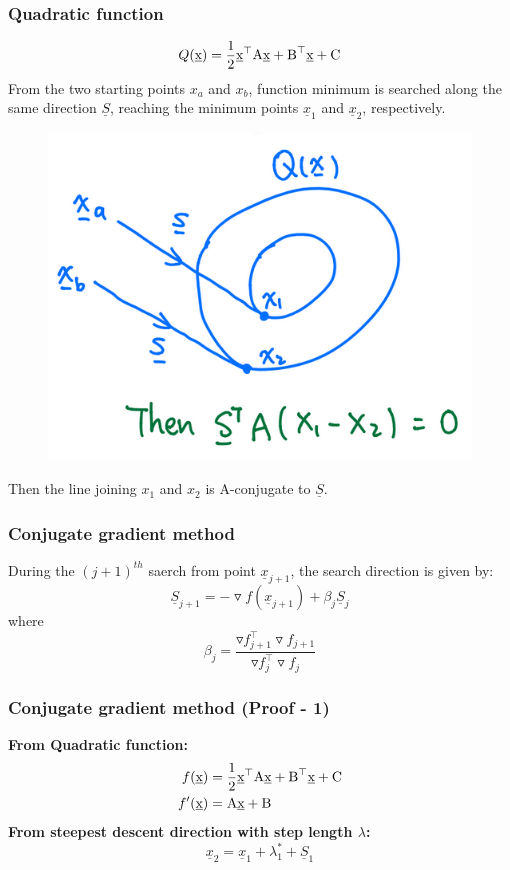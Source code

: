 \documentclass{beamer}
\begin{document}
\begin{frame}
    \frametitle{Quadratic function}
    $$Q(\textrm{\underline{x}})=\frac{1}{2}\textrm{\underline{x}}^\top\textrm{A}\textrm{\underline{x}}+
    \textrm{B}^\top\textrm{\underline{x}}+\textrm{C}
    $$
    From the two starting points $x_a$ and $x_b$, function minimum is searched along the same direction $\underline{S}$,
    reaching the minimum points $\underline{x}_1$ and $\underline{x}_2$, respectively.
    \begin{figure}
    \includegraphics[scale=0.25]{img/quadratic.png}
    \centering
    \end{figure}
    Then the line joining $x_1$ and $x_2$ is $\textrm{A}$-conjugate to $\underline{S}$.
\end{frame}

\begin{frame}
    \frametitle{Conjugate gradient method}
    During the $(j+1)^{th}$ saerch from point $\underline{x}_{j+1}$, the search direction is given by:
    $$\underline{S}_{j+1}=-\triangledown f(\underline{x}_{j+1})+\beta_j \underline{S}_j$$
    where $$\beta_j=\frac{\triangledown f_{j+1}^\top\triangledown f_{j+1}}{\triangledown f_{j}^\top\triangledown f_{j}}$$
\end{frame}

\begin{frame}
    \frametitle{Conjugate gradient method (Proof - 1)}
    \textbf{From Quadratic function:}
    \begin{align*}f(\textrm{\underline{x}})&=\frac{1}{2}\textrm{\underline{x}}^\top\textrm{A}\textrm{\underline{x}}+
    \textrm{B}^\top\textrm{\underline{x}}+\textrm{C} \\
    f'(\textrm{\underline{x}})&=\textrm{A}\textrm{\underline{x}}+\textrm{B}
    \end{align*}
    \textbf{From steepest descent direction with step length $\lambda$:}
    $$\underline{x}_2=\underline{x}_1+\lambda_1^*+\underline{S}_1$$
\end{frame}
\end{document}
